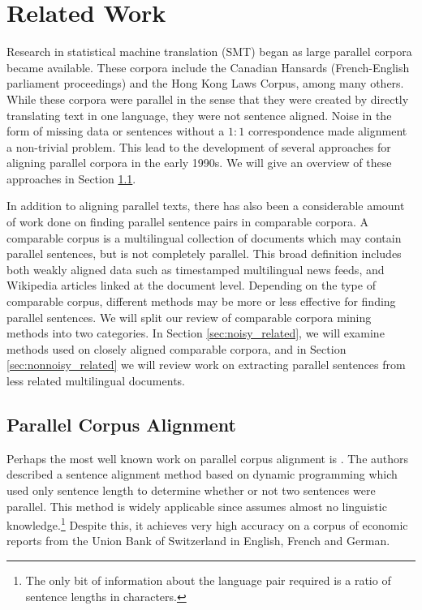 \chapter{Related Work}
\label{chap:related_work}

Research in statistical machine translation (SMT) began as large parallel
corpora became available. These corpora include the Canadian Hansards
(French-English parliament proceedings) and the Hong Kong Laws Corpus, among many
others. While these corpora were parallel in the sense that they were created by
directly translating text in one language, they were not sentence aligned. Noise
in the form of missing data or sentences without a $1:1$ correspondence made
alignment a non-trivial problem. This lead to the development of several
approaches for aligning parallel corpora in the early 1990s. We will give an
overview of these approaches in Section \ref{sec:parallel_related}.

In addition to aligning parallel texts, there has also been a considerable
amount of work done on finding parallel sentence pairs in comparable corpora. A
comparable corpus is a multilingual collection of documents which may contain
parallel sentences, but is not completely parallel. This broad definition
includes both weakly aligned data such as timestamped multilingual news feeds,
and Wikipedia articles linked at the document level. Depending on the type of
comparable corpus, different methods may be more or less effective for finding
parallel sentences. We will split our review of comparable corpora mining
methods into two categories. In Section \ref{sec:noisy_related}, we will examine
methods used on closely aligned comparable corpora, and in Section
\ref{sec:nonnoisy_related} we will review work on extracting parallel sentences
from less related multilingual documents.

\section{Parallel Corpus Alignment}
\label{sec:parallel_related}
Perhaps the most well known work on parallel corpus alignment is \citet{Gale93}.
The authors described a sentence alignment method based on dynamic programming
which used only sentence length to determine whether or not two sentences were
parallel. This method is widely applicable since assumes almost no linguistic
knowledge.\footnote{The only bit of information about the language pair required
is a ratio of sentence lengths in characters.} Despite this, it achieves very
high accuracy on a corpus of economic reports from the Union Bank of Switzerland
in English, French and German.

